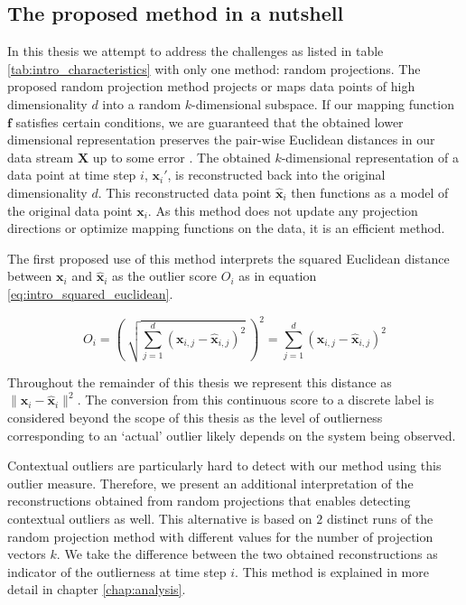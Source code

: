 \subsection{The proposed method in a nutshell}
In this thesis we attempt to address the challenges as listed in table \ref{tab:intro_characteristics} with only one method: random projections. The proposed random projection method projects or maps data points of high dimensionality $d$ into a random $k$-dimensional subspace. If our mapping function $\mathbf{f}$ satisfies certain conditions, we are guaranteed that the obtained lower dimensional representation preserves the pair-wise Euclidean distances in our data stream ${\mathbf X}$ up to some error \cite{johnson1984extensions}. The obtained $k$-dimensional representation of a data point at time step $i$, $\mathbf{x}_i'$, is reconstructed back into the original dimensionality $d$. This reconstructed data point $\hat{\mathbf{x}}_i$ then functions as a model of the original data point $\mathbf{x}_i$. As this method does not update any projection directions or optimize mapping functions on the data, it is an efficient method.

The first proposed use of this method interprets the squared Euclidean distance between $\mathbf{x}_i$ and $\hat{\mathbf{x}}_i$ as the outlier score $O_i$ as in equation \eqref{eq:intro_squared_euclidean}. 

\begin{equation}\label{eq:intro_squared_euclidean}
	O_i =\left( \ \sqrt{\sum\limits_{j=1}^d (\mathbf{x}_{i,j} - \hat{\mathbf{x}}_{i,j})^2} \ \right)^2 = \sum\limits_{j=1}^d (\mathbf{x}_{i,j} - \hat{\mathbf{x}}_{i,j})^2
\end{equation}

\noindent Throughout the remainder of this thesis we represent this distance as $\|\mathbf{x}_i - \hat{\mathbf{x}}_i\|^2$. The conversion from this continuous score to a discrete label is considered beyond the scope of this thesis as the level of outlierness corresponding to an `actual' outlier likely depends on the system being observed.


Contextual outliers are particularly hard to detect with our method using this outlier measure. Therefore, we present an additional interpretation of the reconstructions obtained from random projections that enables detecting contextual outliers as well. This alternative is based on $2$ distinct runs of the random projection method with different values for the number of projection vectors $k$. We take the difference between the two obtained reconstructions as indicator of the outlierness at time step $i$. This method is explained in more detail in chapter \ref{chap:analysis}.

